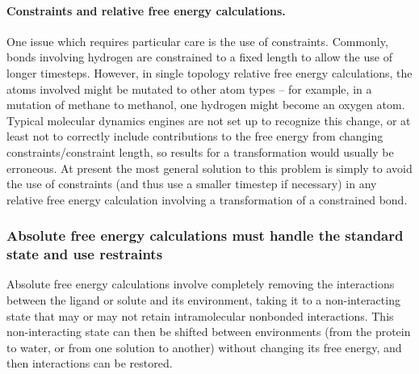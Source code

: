 \documentclass[9pt,bestpractices]{livecoms}
\begin{document}
\paragraph{Constraints and relative free energy calculations.}
One issue which requires particular care is the use of constraints.
Commonly, bonds involving hydrogen are constrained to a fixed length to allow the use of longer timesteps.
However, in single topology relative free energy calculations, the atoms involved might be mutated to other atom types -- for example, in a mutation of methane to methanol, one hydrogen might become an oxygen atom.
Typical molecular dynamics engines are not set up to recognize this change, or at least not to correctly include contributions to the free energy from changing constraints/constraint length, so results for a transformation would usually be erroneous.
At present the most general solution to this problem is simply to avoid the use of constraints (and thus use a smaller timestep if necessary) in any relative free energy calculation involving a transformation of a constrained bond.

\subsubsection{Absolute free energy calculations must handle the standard state and use restraints}
\label{sec:standardstate-restraints}



Absolute free energy calculations involve completely removing the interactions between the ligand or solute and its environment, taking it to a non-interacting state that may or may not retain intramolecular nonbonded interactions.
This non-interacting state can then be shifted between environments (from the protein to water, or from one solution to another) without changing its free energy, and then interactions can be restored.
\end{document}
